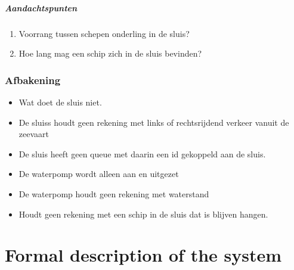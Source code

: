 {{{{{{{{{{{{{{\paragraph{Aandachtspunten}
\begin{enumerate}
	\item Voorrang tussen schepen onderling in de sluis?
	\item Hoe lang mag een schip zich in de sluis bevinden?
\end{enumerate} 




\subsection{Afbakening}
\begin{itemize}
	\item Wat doet de sluis niet.
	\item De sluiss houdt geen rekening met links of rechtsrijdend verkeer vanuit de zeevaart
	\item De sluis heeft geen queue met daarin een id gekoppeld aan de sluis.
	\item De waterpomp wordt alleen aan en uitgezet
	\item De waterpomp houdt geen rekening met waterstand
	\item Houdt geen rekening met een schip in de sluis dat is blijven hangen.
	
\end{itemize}

\chapter{Formal description of the system}

}}}}}}}}}}}}}}

